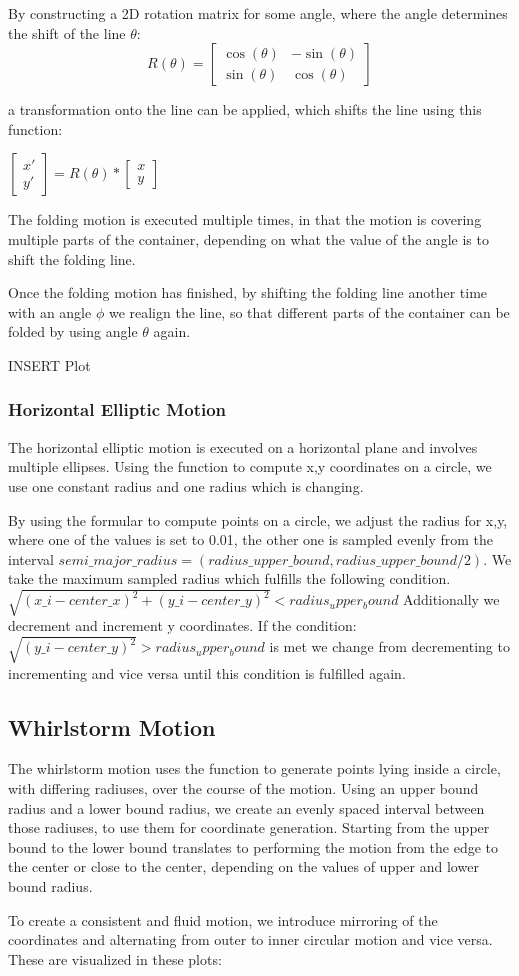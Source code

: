 By constructing a 2D rotation matrix for some angle, where the angle determines the shift of the line $\theta$:
\[R(\theta) = \begin{bmatrix}
    \cos(\theta) & -\sin(\theta) \\
    \sin(\theta) & \cos(\theta)
     \end{bmatrix}
 \] 

a transformation onto the line can be applied, which shifts the line using this function: 

$\begin{bmatrix} x' \\ y' \end{bmatrix} = R(\theta) * \begin{bmatrix} x \\ y \end{bmatrix}$

The folding motion is executed multiple times, in that the motion is covering multiple parts of the container, depending on what 
the value of the angle is to shift the folding line. 

Once the folding motion has finished, by shifting the folding line another time with an angle $\phi$
we realign the line, so that different parts of the container can be folded by using angle $\theta$ again.

INSERT Plot

\subsubsection{Horizontal Elliptic Motion}
The horizontal elliptic motion is executed on a horizontal plane and involves multiple ellipses.
Using the function to compute x,y coordinates on a circle, we use one constant radius and one radius which is changing. 

By using the formular to compute points on a circle, we adjust the radius for 
x,y, where one of the values is set to 0.01, the other one is sampled evenly from the interval $semi\_major\_radius = (radius\_upper\_bound,radius\_upper\_bound / 2 ).$
We take the maximum sampled radius which fulfills the following condition. 
$\sqrt{(x\_{i} - center\_x)^2 + (y\_{i} - center\_y)^2} < radius_upper_bound$
Additionally we decrement and increment y coordinates. If the condition: $\sqrt{(y\_{i} - center\_y)^2} > radius_upper_bound$
is met we change from decrementing to incrementing and vice versa until this condition is fulfilled again.

\subsection*{Whirlstorm Motion}
The whirlstorm motion uses the function to generate points lying inside a circle, with differing radiuses, over the course of the motion. 
Using an upper bound radius and a lower bound radius, we create an evenly spaced interval between those radiuses, to use them for coordinate generation. 
Starting from the upper bound to the lower bound translates to performing the motion from the edge to the center or close to the center, depending on the 
values of upper and lower bound radius. 

To create a consistent and fluid motion, we introduce mirroring of the coordinates and alternating from outer to inner circular motion and vice versa.
These are visualized in these plots:


